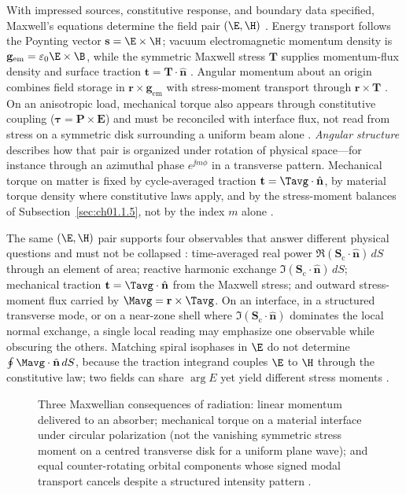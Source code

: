 With impressed sources, constitutive response, and boundary data specified, Maxwell's equations determine the field pair $(\E,\H)$ \cite{maxwell1873}. Energy transport follows the Poynting vector $\mathbf{s}=\E\times\H$; vacuum electromagnetic momentum density is $\mathbf{g}_{\mathrm{em}}=\varepsilon_0\E\times\B$, while the symmetric Maxwell stress $\mathbf{T}$ supplies momentum-flux density and surface traction $\mathbf{t}=\mathbf{T}\cdot\hat{\mathbf{n}}$ \cite{maxwell1873,poynting1884,stratton1941}. Angular momentum about an origin combines field storage in $\mathbf{r}\times\mathbf{g}_{\mathrm{em}}$ with stress-moment transport through $\mathbf{r}\times\mathbf{T}$ \cite{beth1936,stratton1941}. On an anisotropic load, mechanical torque also appears through constitutive coupling ($\boldsymbol\tau=\mathbf P\times\mathbf E$) and must be reconciled with interface flux, not read from stress on a symmetric disk surrounding a uniform beam alone \cite{beth1936,stratton1941}. \emph{Angular structure} describes how that pair is organized under rotation of physical space---for instance through an azimuthal phase $e^{\jj m\phi}$ in a transverse pattern. Mechanical torque on matter is fixed by cycle-averaged traction $\mathbf{t}=\Tavg\cdot\hat{\mathbf{n}}$, by material torque density where constitutive laws apply, and by the stress-moment balances of Subsection~\ref{sec:ch01.1.5}, not by the index $m$ alone \cite{allen1992,stratton1941,beth1936}.

The same $(\E,\H)$ pair supports four observables that answer different physical questions and must not be collapsed \cite{stratton1941}: time-averaged real power $\Re(\mathbf{S}_\mathrm{c}\cdot\hat{\mathbf{n}})\,dS$ through an element of area; reactive harmonic exchange $\Im(\mathbf{S}_\mathrm{c}\cdot\hat{\mathbf{n}})\,dS$; mechanical traction $\mathbf{t}=\Tavg\cdot\hat{\mathbf{n}}$ from the Maxwell stress; and outward stress-moment flux carried by $\Mavg=\mathbf{r}\times\Tavg$. On an interface, in a structured transverse mode, or on a near-zone shell where $\Im(\mathbf{S}_\mathrm{c}\cdot\hat{\mathbf{n}})$ dominates the local normal exchange, a single local reading may emphasize one observable while obscuring the others. Matching spiral isophases in $\E$ do not determine $\oint \Mavg\cdot\hat{\mathbf{n}}\,dS$, because the traction integrand couples $\E$ to $\H$ through the constitutive law; two fields can share $\arg E$ yet yield different stress moments \cite{stratton1941,allen1992}.

\begin{figure}[t]
\centering
\VolIPhysFig{\VolIPhysThreeRadiationConsequences}
\caption{Three Maxwellian consequences of radiation: linear momentum delivered to an absorber; mechanical torque on a material interface under circular polarization (not the vanishing symmetric stress moment on a centred transverse disk for a uniform plane wave); and equal counter-rotating orbital components whose signed modal transport cancels despite a structured intensity pattern \cite{poynting1884,beth1936,allen1992}.}
\label{fig:ch1.three-radiation-consequences}
\end{figure}

